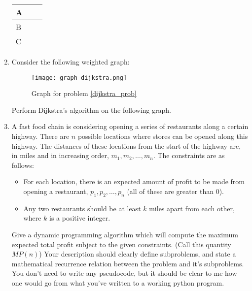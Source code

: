 \documentclass[12pt]{article}
\begin{document}
\begin{enumerate}
     \begin{tabular}{  m{5em} | m{1cm}| m{1cm}  } 
        \hline
         A & \hspace{1cm} & \hspace{1cm} \\
        \hline
         B & \hspace{1cm} & \hspace{1cm} \\ 
        \hline
         C & \hspace{1cm} & \hspace{1cm} \\ 
        \hline
      \end{tabular} 
    \newpage
    \item Consider the following weighted graph:
    \begin{figure}[h]
        \centering
        \caption{Graph for problem \ref{dijkstra_prob}}
        \texttt{[image: graph\_dijkstra.png]}
    \end{figure}
    Perform Dijkstra's algorithm on the following graph. \label{dijkstra_prob}
    \newpage
    \item A fast food chain is considering opening a series of restaurants along a certain highway. There are $n$ possible locations where stores can be opened along this highway. The distances of these locations from the start of the highway are, in miles and in increasing order, $m_1, m_2, \ldots, m_n$. The constraints are as follows:
    \begin{itemize}
        \item For each location, there is an expected amount of profit to be made from opening a restaurant, $p_1, p_2, \ldots, p_n$ (all of these are greater than $0$).
        \item Any two restaurants should be at least $k$ miles apart from each other, where $k$ is a positive integer. 
    \end{itemize} 
    Give a dynamic programming algorithm which will compute the maximum expected total profit subject to the given constraints. (Call this quantity $MP(n)$) Your description should clearly define subproblems, and state a mathematical recurrence relation between the problem and it's subproblems. You don't need to write any pseudocode, but it should be clear to me how one would go from what you've written to a working python program. 
\end{enumerate}
\end{document}
